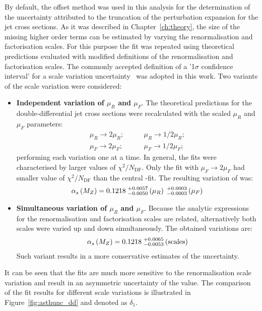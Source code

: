 By default, the offset method was used in this analysis for the determination of the uncertainty attributed to the truncation of the perturbation expansion for the jet cross sections. As it was described in Chapter~\ref{ch:theory}, the size of the missing higher order terms can be estimated by varying the renormalisation and factorisation scales. For this purpose the \asz fit was repeated using theoretical predictions evaluated with modified definitions of the renormalisation and factorisation scales. The commonly accepted definition of a '1$\sigma$ confidence interval' for a scale variation uncertainty~\cite{soper:1997} was adopted in this work. Two variants of the scale variation were considered:
\begin{itemize}
 \item \textbf{Independent variation of $\mu_R$ and $\mu_F$}. The theoretical predictions for the double-differential jet cross sections were recalculated with the scaled $\mu_R$ and $\mu_F$ parameters:
\begin{align}
 \mu_R \rightarrow 2\mu_R;&\qquad \mu_R \rightarrow 1/2\mu_R;\\
 \mu_F \rightarrow 2\mu_F;&\qquad \mu_F \rightarrow 1/2\mu_F;
\end{align}
performing each variation one at a time. In general, the fits were characterised by larger values of $\chi^2/N_\text{DF}$. Only the fit with $\mu_F \rightarrow 2\mu_F$ had smaller value of $\chi^2/N_\text{DF}$ than the central \asz-fit. The resulting variation of \asz was:
\begin{equation}
 \mbox{$\alpha_{s}\left(M_{Z}\right)$} = 0.1218\;^{+0.0057}_{-0.0050}\left(\mu_R\right)\;^{+0.0003}_{-0.0003}\left(\mu_F\right)
\end{equation}
\item \textbf{Simultaneous variation of $\mu_R$ and $\mu_F$}. Because the analytic expressions for the renormalisation and factorisation scales are related, alternatively both scales were varied up and down simultaneously. The obtained variations are:
\begin{equation}
 \mbox{$\alpha_{s}\left(M_{Z}\right)$} = 0.1218\;^{+0.0065}_{-0.0053}\left(\text{scales}\right)
\end{equation}
Such variant results in a more conservative estimates of the uncertainty. 
\end{itemize}
It can be seen that the fits are much more sensitive to the renormalisation scale variation and result in an asymmetric uncertainty of the \asz value. The comparison of the fit results for different scale variations is illustrated in Figure~\ref{fig:asthunc_dd} and denoted as $\delta_1$.


